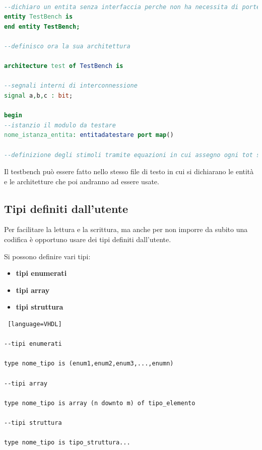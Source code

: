 \documentclass[a4paper]{book}
\begin{document}
\begin{lstlisting}[language=VHDL]

--dichiaro un entita senza interfaccia perche non ha necessita di porte di ingresso e nemmeno di uscita.
entity TestBench is 
end entity TestBench;

--definisco ora la sua architettura

architecture test of TestBench is 

--segnali interni di interconnessione
signal a,b,c : bit;

begin
--istanzio il modulo da testare
nome_istanza_entita: entitadatestare port map()

--definizione degli stimoli tramite equazioni in cui assegno ogni tot secondi un certo valore ai signal del mio testBench che a loro volta verranno assegnati alle porte dell entita da testare.

\end{lstlisting}

Il testbench può essere fatto nello stesso file di testo in cui si dichiarano le entità e le architetture che poi andranno ad essere usate.

\subsection{Tipi definiti dall'utente}

Per facilitare la lettura e la scrittura, ma anche per non imporre da subito una codifica è opportuno usare dei tipi definiti dall'utente.

Si possono definire vari tipi:

\begin{itemize}
\item \textbf{tipi enumerati}
\item \textbf{tipi array}
\item \textbf{tipi struttura}
\end{itemize}



\begin{lstlisting} [language=VHDL]

--tipi enumerati

type nome_tipo is (enum1,enum2,enum3,...,enumn)

--tipi array

type nome_tipo is array (n downto m) of tipo_elemento

--tipi struttura

type nome_tipo is tipo_struttura...

\end{lstlisting}
\end{document}
